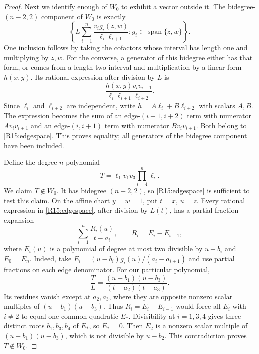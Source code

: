\documentclass[11pt,a4paper]{article}
\theoremstyle{definition}\newtheorem{definition}{Definition}
\begin{document}
\begin{proof}
Next we identify enough of $W_0$ to exhibit a vector outside it.
The bidegree-$(n-2,2)$ component of $W_0$ is exactly
\begin{equation}\label{R15:edgespace}
 \left\{
 L\sum_{i=1}^n
 \frac{v_i g_i(z,w)}{\ell_i\ell_{i+1}}:
 g_i\in\operatorname{span}\{z,w\}
 \right\}.
\end{equation}
One inclusion follows by taking the cofactors whose interval has
length one and multiplying by $z,w$.
For the converse, a generator of this bidegree either has that
form, or comes from a length-two interval and multiplication
by a linear form $h(x,y)$.
Its rational expression after division by $L$ is
\[
 \frac{h(x,y)v_i v_{i+1}}{\ell_i\ell_{i+1}\ell_{i+2}}.
\]
Since $\ell_i$ and $\ell_{i+2}$ are independent, write
$h=A\ell_i+B\ell_{i+2}$ with scalars $A,B$.
The expression becomes the sum of an edge-$(i+1,i+2)$ term
with numerator $A v_i v_{i+1}$ and an edge-$(i,i+1)$ term
with numerator $B v_i v_{i+1}$. Both belong to
\eqref{R15:edgespace}. This proves equality; all generators of
the bidegree component have been included.

Define the degree-$n$ polynomial
\[
 T=\ell_1v_1v_3\prod_{i=4}^n\ell_i.
\]
We claim $T\notin W_0$. It has bidegree $(n-2,2)$, so
\eqref{R15:edgespace} is sufficient to test this claim.
On the affine chart $y=w=1$, put $t=x$, $u=z$.
Every rational expression in \eqref{R15:edgespace}, after
division by $L(t)$, has a partial fraction expansion
\[
 \sum_{i=1}^n\frac{R_i(u)}{t-a_i},
 \qquad R_i=E_i-E_{i-1},
\]
where $E_i(u)$ is a polynomial of degree at most two divisible
by $u-b_i$ and $E_0=E_n$. Indeed, take
$E_i=(u-b_i)g_i(u)/(a_i-a_{i+1})$ and use partial fractions
on each edge denominator.
For our particular polynomial,
\[
 \frac{T}{L}
 =\frac{(u-b_1)(u-b_3)}{(t-a_2)(t-a_3)}.
\]
Its residues vanish except at $a_2,a_3$, where they are
opposite nonzero scalar multiples of $(u-b_1)(u-b_3)$.
Thus $R_i=E_i-E_{i-1}$ would force all $E_i$ with $i\ne2$
to equal one common quadratic $E_*$. Divisibility at
$i=1,3,4$ gives three distinct roots $b_1,b_3,b_4$ of $E_*$,
so $E_*=0$.
Then $E_2$ is a nonzero scalar multiple of
$(u-b_1)(u-b_3)$, which is not divisible by $u-b_2$.
This contradiction proves $T\notin W_0$.


\end{proof}
\end{document}
